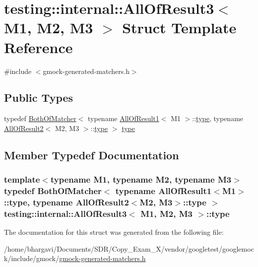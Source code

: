 \hypertarget{structtesting_1_1internal_1_1_all_of_result3}{}\section{testing\+:\+:internal\+:\+:All\+Of\+Result3$<$ M1, M2, M3 $>$ Struct Template Reference}
\label{structtesting_1_1internal_1_1_all_of_result3}


{\ttfamily \#include $<$gmock-\/generated-\/matchers.\+h$>$}

\subsection*{Public Types}
\begin{DoxyCompactItemize}
\item 
typedef \hyperlink{classtesting_1_1internal_1_1_both_of_matcher}{Both\+Of\+Matcher}$<$ typename \hyperlink{structtesting_1_1internal_1_1_all_of_result1}{All\+Of\+Result1}$<$ M1 $>$\+::\hyperlink{structtesting_1_1internal_1_1_all_of_result3_a18073a23acd542bccf3a6c5d7f72f957}{type}, typename \hyperlink{structtesting_1_1internal_1_1_all_of_result2}{All\+Of\+Result2}$<$ M2, M3 $>$\+::\hyperlink{structtesting_1_1internal_1_1_all_of_result3_a18073a23acd542bccf3a6c5d7f72f957}{type} $>$ \hyperlink{structtesting_1_1internal_1_1_all_of_result3_a18073a23acd542bccf3a6c5d7f72f957}{type}
\end{DoxyCompactItemize}


\subsection{Member Typedef Documentation}
\subsubsection[{\texorpdfstring{type}{type}}]{\setlength{\rightskip}{0pt plus 5cm}template$<$typename M1, typename M2, typename M3$>$ typedef {\bf Both\+Of\+Matcher}$<$ typename {\bf All\+Of\+Result1}$<$M1$>$\+::{\bf type}, typename {\bf All\+Of\+Result2}$<$M2, M3$>$\+::{\bf type} $>$ {\bf testing\+::internal\+::\+All\+Of\+Result3}$<$ M1, M2, M3 $>$\+::{\bf type}}\hypertarget{structtesting_1_1internal_1_1_all_of_result3_a18073a23acd542bccf3a6c5d7f72f957}{}\label{structtesting_1_1internal_1_1_all_of_result3_a18073a23acd542bccf3a6c5d7f72f957}


The documentation for this struct was generated from the following file\+:\begin{DoxyCompactItemize}
\item 
/home/bhargavi/\+Documents/\+S\+D\+R/\+Copy\+\_\+\+Exam\+\_\+X/vendor/googletest/googlemock/include/gmock/\hyperlink{gmock-generated-matchers_8h}{gmock-\/generated-\/matchers.\+h}\end{DoxyCompactItemize}
